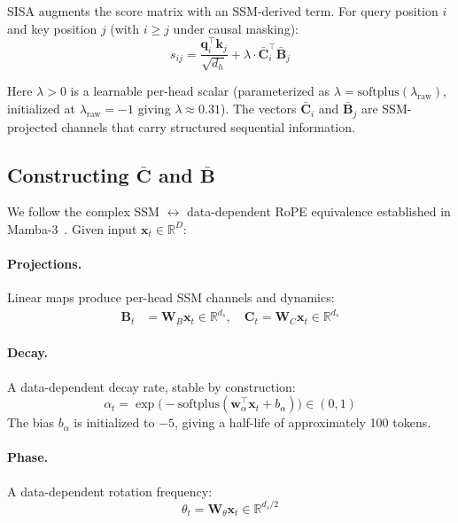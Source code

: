 \documentclass[11pt]{article}
\begin{document}
SISA augments the score matrix with an SSM-derived term. For query position $i$ and key position $j$ (with $i \geq j$ under causal masking):
\begin{equation}
s_{ij} = \frac{\mathbf{q}_i^\top \mathbf{k}_j}{\sqrt{d_h}} + \lambda \cdot \bar{\mathbf{C}}_i^\top \bar{\mathbf{B}}_j
\end{equation}

Here $\lambda > 0$ is a learnable per-head scalar (parameterized as $\lambda = \text{softplus}(\lambda_{\text{raw}})$, initialized at $\lambda_{\text{raw}} = -1$ giving $\lambda \approx 0.31$). The vectors $\bar{\mathbf{C}}_i$ and $\bar{\mathbf{B}}_j$ are SSM-projected channels that carry structured sequential information.

\subsection{Constructing $\bar{\mathbf{C}}$ and $\bar{\mathbf{B}}$}

We follow the complex SSM $\leftrightarrow$ data-dependent RoPE equivalence established in Mamba-3~\citep{mamba3}. Given input $\mathbf{x}_t \in \mathbb{R}^D$:

\paragraph{Projections.} Linear maps produce per-head SSM channels and dynamics:
\begin{align}
\mathbf{B}_t &= \mathbf{W}_B \mathbf{x}_t \in \mathbb{R}^{d_s}, \quad \mathbf{C}_t = \mathbf{W}_C \mathbf{x}_t \in \mathbb{R}^{d_s}
\end{align}

\paragraph{Decay.} A data-dependent decay rate, stable by construction:
\begin{equation}
\alpha_t = \exp\!\big(-\text{softplus}(\mathbf{w}_\alpha^\top \mathbf{x}_t + b_\alpha)\big) \in (0, 1)
\end{equation}
The bias $b_\alpha$ is initialized to $-5$, giving a half-life of approximately 100 tokens.

\paragraph{Phase.} A data-dependent rotation frequency:
\begin{equation}
\theta_t = \mathbf{W}_\theta \mathbf{x}_t \in \mathbb{R}^{d_s / 2}
\end{equation}
\end{document}
